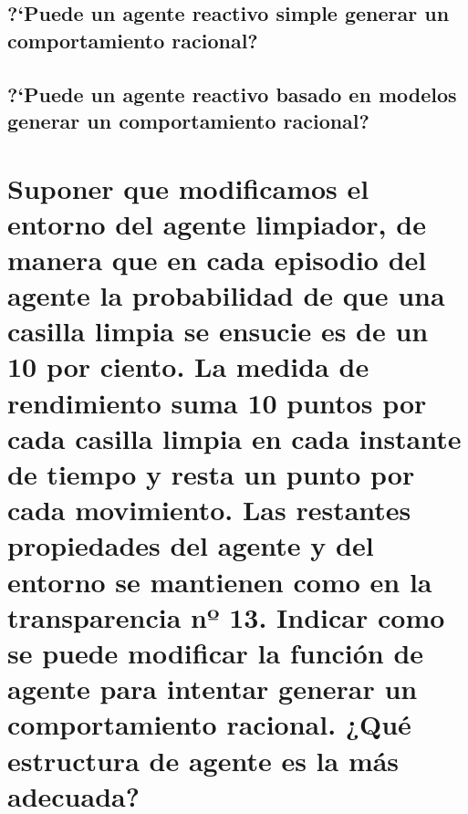 \documentclass[10pt, a4paper,spanish]{article}
\begin{document}
		\subsection{?`Puede un agente reactivo simple generar un comportamiento racional?}

			\paragraph{}


		\subsection{?`Puede un agente reactivo basado en modelos generar un comportamiento racional?}

			\paragraph{}



	\section{Suponer que modificamos el entorno del agente limpiador, de manera que en cada episodio del agente la probabilidad de que una casilla limpia se ensucie es de un 10 por ciento. La medida de rendimiento suma 10 puntos por cada casilla limpia en cada instante de tiempo y resta un punto por cada movimiento. Las restantes propiedades del agente y del entorno se mantienen como en la transparencia nº 13. Indicar como se puede modificar la función de agente para intentar generar un comportamiento racional. ¿Qué estructura de agente es la más adecuada?}

		\paragraph{}
\end{document}
